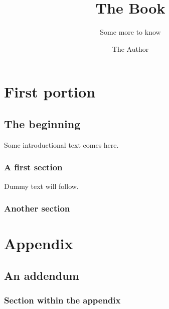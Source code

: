 \documentclass[fontsize=11pt,paper=a5,pagesize=auto]{scrbook}
\begin{document}
\title{The Book}
\subtitle{Some more to know}
\author{The Author}
\date{}
\maketitle
\tableofcontents 
\part{First portion}
\chapter{The beginning}
Some introductional text comes here.
\section{A first section}
Dummy text will follow.
\blindtext
\section{Another section}
\Blindtext
\appendix
\part{Appendix}
\chapter{An addendum}
\section{Section within the appendix}
\blindtext
\end{document}
